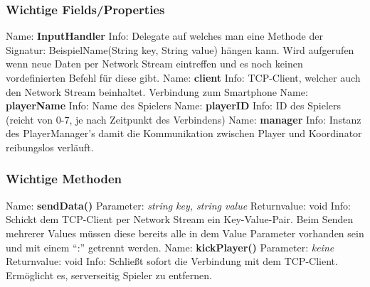 \subsubsection{Wichtige Fields/Properties}
Name: \textbf{InputHandler}
\newline 
Info: Delegate auf welches man eine Methode der Signatur:
BeispielName(String key, String value) hängen kann. Wird aufgerufen wenn neue Daten per Network Stream eintreffen und es noch keinen vordefinierten Befehl für diese gibt.
\newline \newline
Name: \textbf{client}
\newline 
Info: TCP-Client, welcher auch den Network Stream beinhaltet. Verbindung zum Smartphone
\newline \newline
Name: \textbf{playerName}
\newline 
Info: Name des Spielers
\newline \newline
Name: \textbf{playerID}
\newline 
Info: ID des Spielers (reicht von 0-7, je nach Zeitpunkt des Verbindens)
\newline \newline
Name: \textbf{manager}
\newline
Info: Instanz des PlayerManager’s damit die Kommunikation zwischen Player und Koordinator reibungslos verläuft.
\newline \newline
\subsubsection{Wichtige Methoden}
Name: \textbf{sendData()}
\newline
Parameter: \textit{string key, string value}
\newline
Returnvalue: void
\newline
Info: Schickt dem TCP-Client per Network Stream ein Key-Value-Pair. Beim Senden mehrerer Values müssen diese bereits alle in dem Value Parameter vorhanden sein und mit einem “:” getrennt werden.
\newline \newline
Name: \textbf{kickPlayer()}
\newline
Parameter: \textit{keine}
\newline
Returnvalue: void
\newline
Info: Schließt sofort die Verbindung mit dem TCP-Client. Ermöglicht es, serverseitig Spieler zu entfernen.
\newline
